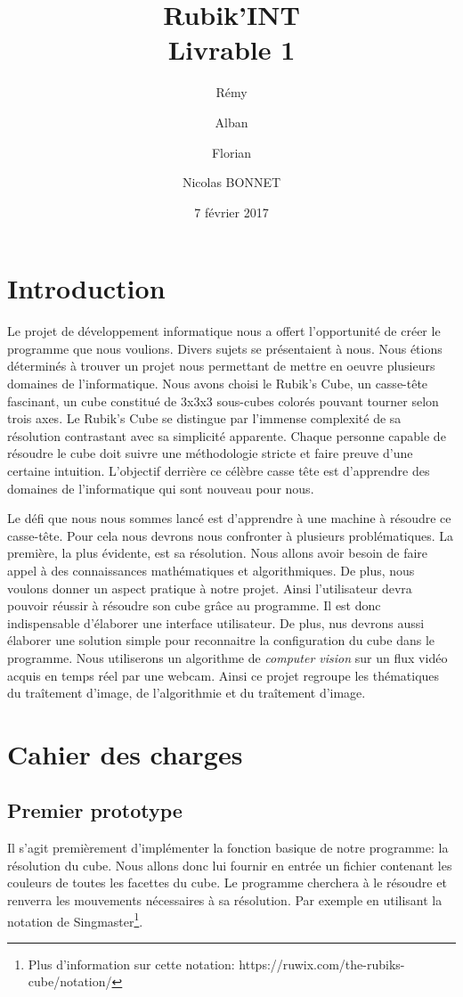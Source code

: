 \documentclass[a4paper]{report}
\title{Rubik'INT \\ Livrable 1}
\author{Rémy \bsc{ZIRNHELD} \and Alban \bsc{MANZANO} \and Florian \bsc{GRANTE} \and Nicolas {BONNET}}
\date{7 février 2017}
\begin{document}
\maketitle

\tableofcontents

\chapter*{Introduction}

Le projet de développement informatique nous a offert l'opportunité de créer le programme que nous voulions.
Divers sujets se présentaient à nous. Nous étions déterminés à trouver un projet nous permettant de mettre en oeuvre plusieurs domaines de l'informatique. 
Nous avons choisi le Rubik's Cube, un casse-tête fascinant, un cube constitué de 3x3x3 sous-cubes colorés pouvant tourner selon trois axes. 
Le Rubik's Cube se distingue par l'immense complexité de sa résolution contrastant avec sa simplicité apparente.
Chaque personne capable de résoudre le cube doit suivre une méthodologie stricte et faire preuve d'une certaine intuition.
L'objectif derrière ce célèbre casse tête est d'apprendre des domaines de l'informatique qui sont nouveau pour nous.

Le défi que nous nous sommes lancé est d'apprendre à une machine à résoudre ce casse-tête.
Pour cela nous devrons nous confronter à plusieurs problématiques.
La première, la plus évidente, est sa résolution. Nous allons avoir besoin de faire appel à des connaissances mathématiques et algorithmiques.
De plus, nous voulons donner un aspect pratique à notre projet. Ainsi l'utilisateur devra pouvoir réussir à résoudre son cube grâce au programme.
Il est donc indispensable d'élaborer une interface utilisateur.
De plus, nus devrons aussi élaborer une solution simple pour reconnaitre la configuration du cube dans le programme. Nous utiliserons un algorithme de \textit{computer vision} sur un flux vidéo acquis en temps réel par une webcam.
Ainsi ce projet regroupe les thématiques du traîtement d'image, de l'algorithmie et du traîtement d'image.


\chapter{Cahier des charges}
\section{Premier prototype}
Il s'agit premièrement d'implémenter la fonction basique de notre programme: la résolution du cube. Nous allons donc lui fournir en entrée un fichier contenant les couleurs de toutes les facettes du cube. Le programme cherchera à le résoudre et renverra les mouvements nécessaires à sa résolution. Par exemple en utilisant la notation de Singmaster\footnote{Plus d'information sur cette notation: https://ruwix.com/the-rubiks-cube/notation/}.
\end{document}
